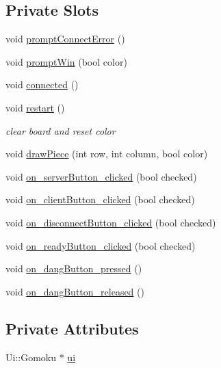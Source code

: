 \subsection*{Private Slots}
\begin{DoxyCompactItemize}
\item 
void \hyperlink{classGomoku_aafba38e2b2db2f0f0262a04b371b65b8}{prompt\+Connect\+Error} ()
\item 
void \hyperlink{classGomoku_a32aa94d4d8d3e340cd719e84ad51409d}{prompt\+Win} (bool color)
\item 
void \hyperlink{classGomoku_af7ab4e7e8061535ad746cb839f941fc6}{connected} ()
\item 
void \hyperlink{classGomoku_a9dde3f2dc64f4328918b0050e9635f98}{restart} ()
\begin{DoxyCompactList}\small\item\em clear board and reset color \end{DoxyCompactList}\item 
void \hyperlink{classGomoku_ada061f4b14409da12995cbe5e257e67e}{draw\+Piece} (int row, int column, bool color)
\item 
void \hyperlink{classGomoku_a763119d315fe24ef55bc581e67836856}{on\+\_\+server\+Button\+\_\+clicked} (bool checked)
\item 
void \hyperlink{classGomoku_a69e00fb73a572a157bd93e9720987c54}{on\+\_\+client\+Button\+\_\+clicked} (bool checked)
\item 
void \hyperlink{classGomoku_a8722500f524e6902a423ec33f31159a9}{on\+\_\+disconnect\+Button\+\_\+clicked} (bool checked)
\item 
void \hyperlink{classGomoku_a123db139238bd134421ae0cd7756bc84}{on\+\_\+ready\+Button\+\_\+clicked} (bool checked)
\item 
void \hyperlink{classGomoku_a0a1c400cb33e45b092931f99de732dd0}{on\+\_\+dang\+Button\+\_\+pressed} ()
\item 
void \hyperlink{classGomoku_aa703e7bc0d628d98f6f20a6f861e92d7}{on\+\_\+dang\+Button\+\_\+released} ()
\end{DoxyCompactItemize}
\subsection*{Private Attributes}
\begin{DoxyCompactItemize}
\item 
Ui\+::\+Gomoku $\ast$ \hyperlink{classGomoku_ac7bd58f9bde18d468518e5f78c458cf9}{ui}
\end{DoxyCompactItemize}


